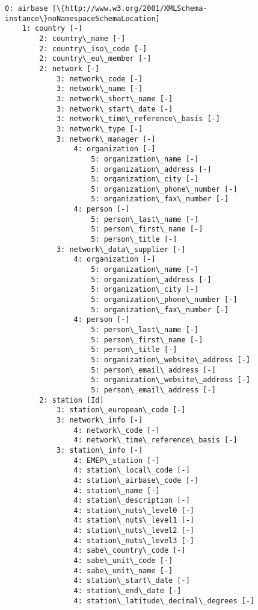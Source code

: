 \documentclass[11pt]{article}
\begin{document}
    \begin{Verbatim}[commandchars=\\\{\}]
0: airbase [\{http://www.w3.org/2001/XMLSchema-instance\}noNamespaceSchemaLocation]
    1: country [-]
        2: country\_name [-]
        2: country\_iso\_code [-]
        2: country\_eu\_member [-]
        2: network [-]
            3: network\_code [-]
            3: network\_name [-]
            3: network\_short\_name [-]
            3: network\_start\_date [-]
            3: network\_time\_reference\_basis [-]
            3: network\_type [-]
            3: network\_manager [-]
                4: organization [-]
                    5: organization\_name [-]
                    5: organization\_address [-]
                    5: organization\_city [-]
                    5: organization\_phone\_number [-]
                    5: organization\_fax\_number [-]
                4: person [-]
                    5: person\_last\_name [-]
                    5: person\_first\_name [-]
                    5: person\_title [-]
            3: network\_data\_supplier [-]
                4: organization [-]
                    5: organization\_name [-]
                    5: organization\_address [-]
                    5: organization\_city [-]
                    5: organization\_phone\_number [-]
                    5: organization\_fax\_number [-]
                4: person [-]
                    5: person\_last\_name [-]
                    5: person\_first\_name [-]
                    5: person\_title [-]
                    5: organization\_website\_address [-]
                    5: person\_email\_address [-]
                    5: organization\_website\_address [-]
                    5: person\_email\_address [-]
        2: station [Id]
            3: station\_european\_code [-]
            3: network\_info [-]
                4: network\_code [-]
                4: network\_time\_reference\_basis [-]
            3: station\_info [-]
                4: EMEP\_station [-]
                4: station\_local\_code [-]
                4: station\_airbase\_code [-]
                4: station\_name [-]
                4: station\_description [-]
                4: station\_nuts\_level0 [-]
                4: station\_nuts\_level1 [-]
                4: station\_nuts\_level2 [-]
                4: station\_nuts\_level3 [-]
                4: sabe\_country\_code [-]
                4: sabe\_unit\_code [-]
                4: sabe\_unit\_name [-]
                4: station\_start\_date [-]
                4: station\_end\_date [-]
                4: station\_latitude\_decimal\_degrees [-]

\end{Verbatim}
\end{document}
